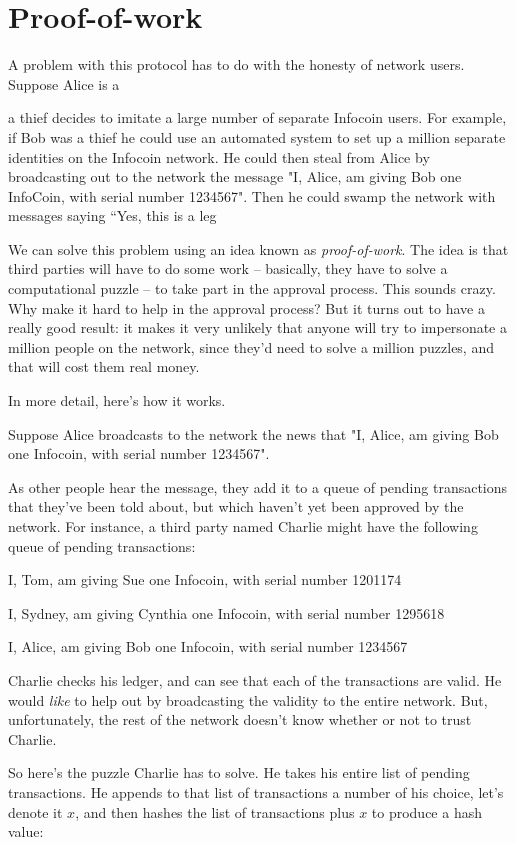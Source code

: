 \documentclass[12pt]{book}
\newcounter{problem}[chapter]
\newcounter{example}[chapter]
\begin{document}
\section{Proof-of-work}

A problem with this protocol has to do with the honesty of network
users.  Suppose Alice is a 

a thief decides to imitate a large number of separate
Infocoin users.  For example, if Bob was a thief he could use an
automated system to set up a million separate identities on the
Infocoin network.  He could then steal from Alice by broadcasting out
to the network the message "I, Alice, am giving Bob one InfoCoin, with
serial number 1234567".  Then he could swamp the network with messages
saying ``Yes, this is a leg

We can solve this problem using an idea known as \emph{proof-of-work}.
The idea is that third parties will have to do some work -- basically,
they have to solve a computational puzzle -- to take part in the
approval process.  This sounds crazy.  Why make it hard to help in the
approval process?  But it turns out to have a really good result: it
makes it very unlikely that anyone will try to impersonate a million
people on the network, since they'd need to solve a million puzzles,
and that will cost them real money.

In more detail, here's how it works.

Suppose Alice broadcasts to the network the news that "I, Alice, am
giving Bob one Infocoin, with serial number 1234567".  

As other people hear the message, they add it to a queue of pending
transactions that they've been told about, but which haven't yet been
approved by the network.  For instance, a third party named Charlie
might have the following queue of pending transactions:

I, Tom, am giving Sue one Infocoin, with serial number 1201174

I, Sydney, am giving Cynthia one Infocoin, with serial number 1295618

I, Alice, am giving Bob one Infocoin, with serial number 1234567

Charlie checks his ledger, and can see that each of the transactions
are valid.  He would \emph{like} to help out by broadcasting the
validity to the entire network.  But, unfortunately, the rest of the
network doesn't know whether or not to trust Charlie.

So here's the puzzle Charlie has to solve.  He takes his entire list
of pending transactions.  He appends to that list of transactions a
number of his choice, let's denote it $x$, and then hashes the list of
transactions plus $x$ to produce a hash value:
\end{document}
